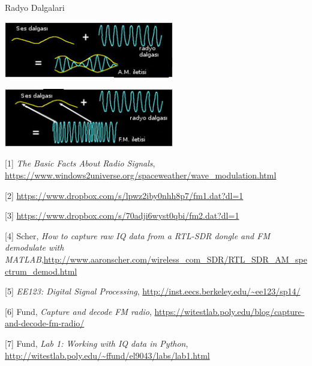 \documentclass[12pt,fleqn]{article}\usepackage{../../common}
\begin{document}
Radyo Dalgalari

\includegraphics[width=20em]{AM_waves.jpg}

\includegraphics[width=20em]{FM_waves.jpg}








[1] {\em The Basic Facts About Radio Signals}, \url{https://www.windows2universe.org/spaceweather/wave_modulation.html}

[2] \url{https://www.dropbox.com/s/lpwz2iby0nhh8p7/fm1.dat?dl=1}

[3] \url{https://www.dropbox.com/s/70adji6wyst0qbi/fm2.dat?dl=1}

[4] Scher, {\em How to capture raw IQ data from a RTL-SDR dongle and FM demodulate with MATLAB},\url{http://www.aaronscher.com/wireless_com_SDR/RTL_SDR_AM_spectrum_demod.html}

[5] {\em EE123: Digital Signal Processing}, \url{http://inst.eecs.berkeley.edu/~ee123/sp14/}

[6] Fund, {\em Capture and decode FM radio}, \url{https://witestlab.poly.edu/blog/capture-and-decode-fm-radio/}

[7] Fund, {\em Lab 1: Working with IQ data in Python}, \url{http://witestlab.poly.edu/~ffund/el9043/labs/lab1.html}
\end{document}
